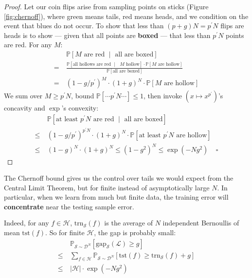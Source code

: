 \documentclass[twocolumn, 11pt]{article}
\newcommand{\PP}{\mathbb{P}}
\newcommand{\Dd}{\mathcal{D}}
\newcommand{\Ee}{\mathcal{E}}
\newcommand{\Hh}{\mathcal{H}}
\newcommand{\Ll}{\mathcal{L}}
\newcommand{\Ss}{\mathcal{S}}
\newcommand{\Uu}{\mathcal{U}}
\newcommand{\Ein} {\text{trn}_{\Ss}} %
\newcommand{\Egap}{\text{gap}_{\Ss}}
\newcommand{\Eout}{\text{tst}} %
\theoremstyle{definition}
\begin{document}
        \begin{proof} \renewcommand{\qedsymbol}{}
            Let our coin flips arise from sampling points on sticks
            (Figure \ref{fig:chernoff}), where green means tails, red
            means heads, and we condition on the event that blues do not occur.
            To show that less than $(p+g)N = p^\prime N$ flips are
            heads is to show --- given that all points are \textbf{boxed} ---
            that less than $p^\prime N$ points are red. 
            For any $M$:
            {%
            \begin{align*}
                    & ~ \PP[\text{$M$ are red $\mid$ all are boxed}] \\
                  = & ~ \frac{\PP[\text{all hollows are red $\mid$ $M$ hollow}] \cdot \PP[\text{$M$ are hollow}]}{\PP[\text{all are boxed}] } \\
                  = & ~ (1 - g/p^\prime)^{M} \cdot (1+g)^{N} \cdot \PP[\text{$M$ are hollow}]
            \end{align*}
            }%
            We sum over $M\geq p^\prime N$, bound $\PP[\cdots p^\prime N \cdots] \leq 1$,
            then invoke $(x \mapsto x^{p^\prime})$'s concavity and
            $\exp$'s convexity:
            \begin{align*}
                &~\PP[\text{at least $p^\prime N$ are red $\mid$ all are boxed}]
                \\ \leq
                &~(1 - g/p^\prime)^{p^\prime N} \cdot (1+g)^{N} \cdot \PP[\text{at least $p^\prime N$ are hollow}]
                \\ \leq
                &~(1 - g)^N \cdot (1 + g)^{N}
                \leq
                (1 - g^2)^N
                \leq
                \exp(- Ng^2)
                ~~~~~\square
            \end{align*}
        \end{proof}

        The Chernoff bound gives us the control over tails we would expect from the
        Central Limit Theorem, but for finite instead of asymptotically large
        $N$.  In particular, when we learn from much but finite data, the
        training error will \textbf{concentrate} near the testing sample error.

        Indeed, for any $f\in \Hh$, $\Ein(f)$ is the average of $N$ independent 
        Bernoullis of mean $\Eout(f)$.  So for finite $\Hh$, the gap is
        probably small:
        \begin{align*}
            &~\PP_{\Ss\sim \Dd^N}[\Egap(\Ll) \geq g] \\
            \leq 
            &~\sum_{f\in \Hh} \PP_{\Ss\sim \Dd^N}[\Eout(f) \geq \Ein(f) + g] \\
            \leq
            &~|\Hh| \cdot \exp(-Ng^2)
        \end{align*}
\end{document}
